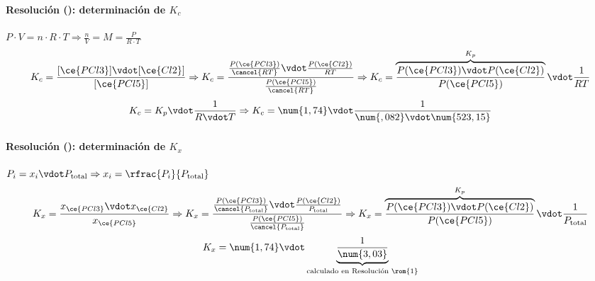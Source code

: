 \begin{frame}
	\frametitle{\ejerciciocmd}
	\framesubtitle{Resolución (): determinación de $K_c$}
	 
	 $P\cdot V=n\cdot R\cdot T\Rightarrow \frac{n}{V}=M=\frac{P}{R\cdot T}$
	$$
		K_c = \frac{[\ce{PCl3}]\vdot[\ce{Cl2}]}{[\ce{PCl5}]}\Rightarrow
		K_c = \frac{\frac{P(\ce{PCl3})}{\cancel{RT}}\vdot\frac{P(\ce{Cl2})}{RT}}{\frac{P(\ce{PCl5})}{\cancel{RT}}}\Rightarrow
		K_c = \overbrace{\frac{P(\ce{PCl3})\vdot P(\ce{Cl2})}{P(\ce{PCl5})}}^{K_p}\vdot\frac{1}{RT}
	$$
	$$
		K_c = K_p\vdot\frac{1}{R\vdot T}\Rightarrow
		K_c = \num{1,74}\vdot\frac{1}{\num{,082}\vdot\num{523,15}}
	$$
	\begin{center}
	\end{center}
\end{frame}

\begin{frame}
	\frametitle{\ejerciciocmd}
	\framesubtitle{Resolución (): determinación de $K_x$}
	 
	 $P_i = x_i\vdot P_{\text{total}}\Rightarrow x_i = \rfrac{P_i}{P_{\text{total}}}$
	$$
		K_x = \frac{x_{\ce{PCl3}}\vdot x_{\ce{Cl2}}}{x_{\ce{PCl5}}}\Rightarrow
		K_x = \frac{\frac{P(\ce{PCl3})}{\cancel{P_{\text{total}}}}\vdot\frac{P(\ce{Cl2})}{P_{\text{total}}}}{\frac{P(\ce{PCl5})}{\cancel{P_{\text{total}}}}}\Rightarrow
		K_x = \overbrace{\frac{P(\ce{PCl3})\vdot P(\ce{Cl2})}{P(\ce{PCl5})}}^{K_p}\vdot\frac{1}{P_{\text{total}}}
	$$
	$$
		K_x = \num{1,74}\vdot\underbrace{\frac{1}{\num{3,03}}}_{\text{calculado en Resolución~\rom{1}}}
	$$
	\begin{center}
	\end{center}
\end{frame}
